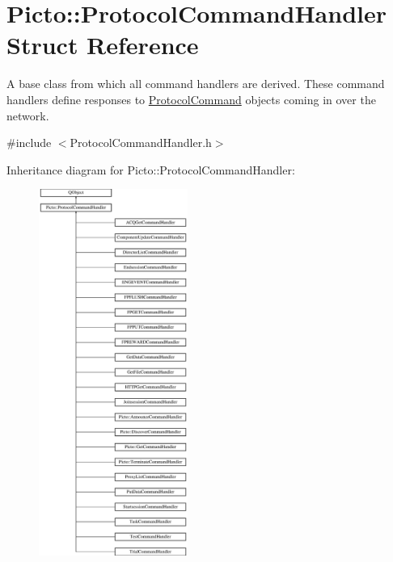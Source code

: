 \hypertarget{struct_picto_1_1_protocol_command_handler}{\section{Picto\-:\-:Protocol\-Command\-Handler Struct Reference}
\label{struct_picto_1_1_protocol_command_handler}
}


A base class from which all command handlers are derived. These command handlers define responses to \hyperlink{struct_picto_1_1_protocol_command}{Protocol\-Command} objects coming in over the network.  




{\ttfamily \#include $<$Protocol\-Command\-Handler.\-h$>$}

Inheritance diagram for Picto\-:\-:Protocol\-Command\-Handler\-:\begin{figure}[H]
\begin{center}
\leavevmode
\includegraphics[height=12.000000cm]{struct_picto_1_1_protocol_command_handler}
\end{center}
\end{figure}
